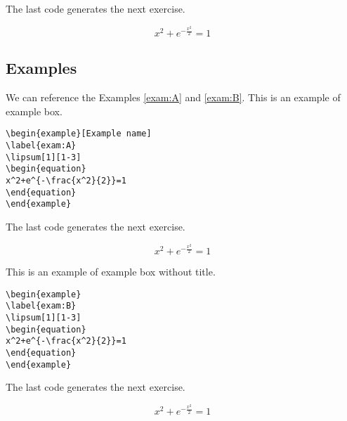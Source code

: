 The last code generates the next exercise.
\begin{exercise}
\label{exer:B}
\lipsum[1][1-3]
\begin{equation}
x^2+e^{-\frac{x^2}{2}}=1
\end{equation}
\end{exercise}


\subsection{Examples}

We can reference the Examples \ref{exam:A} and \ref{exam:B}.
This is an example of example box.

\begin{highlightbox}
\begin{verbatim}
\begin{example}[Example name]
\label{exam:A}
\lipsum[1][1-3]
\begin{equation}
x^2+e^{-\frac{x^2}{2}}=1
\end{equation}
\end{example}
\end{verbatim}
\end{highlightbox}

The last code generates the next exercise.
\begin{example}
\label{exam:A}
\lipsum[1][1-3]
\begin{equation}
x^2+e^{-\frac{x^2}{2}}=1
\end{equation}
\end{example}

This is an example of example box without title.
\begin{highlightbox}
\begin{verbatim}
\begin{example}
\label{exam:B}
\lipsum[1][1-3]
\begin{equation}
x^2+e^{-\frac{x^2}{2}}=1
\end{equation}
\end{example}
\end{verbatim}
\end{highlightbox}

The last code generates the next exercise.
\begin{example}
\label{exam:B}
\lipsum[1][1-3]
\begin{equation}
x^2+e^{-\frac{x^2}{2}}=1
\end{equation}
\end{example}
